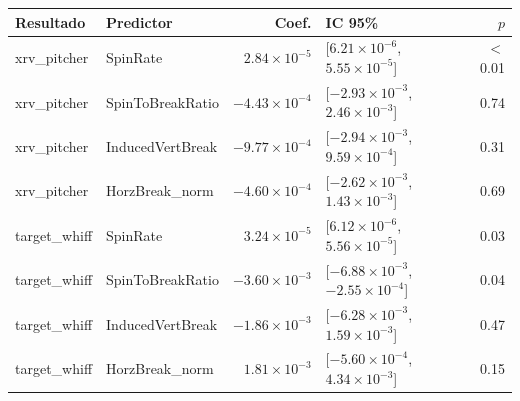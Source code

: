 \begin{tabular}{llrlr}
\toprule
Resultado & Predictor & Coef. & IC 95\% & $p$ \\
\midrule
xrv\_pitcher & SpinRate & $2.84\times10^{-5}$ & [$6.21\times10^{-6}$, $5.55\times10^{-5}$] & \ensuremath{<}0.01 \\
xrv\_pitcher & SpinToBreakRatio & $-4.43\times10^{-4}$ & [$-2.93\times10^{-3}$, $2.46\times10^{-3}$] & 0.74 \\
xrv\_pitcher & InducedVertBreak & $-9.77\times10^{-4}$ & [$-2.94\times10^{-3}$, $9.59\times10^{-4}$] & 0.31 \\
xrv\_pitcher & HorzBreak\_norm & $-4.60\times10^{-4}$ & [$-2.62\times10^{-3}$, $1.43\times10^{-3}$] & 0.69 \\
\midrule
target\_whiff & SpinRate & $3.24\times10^{-5}$ & [$6.12\times10^{-6}$, $5.56\times10^{-5}$] & 0.03 \\
target\_whiff & SpinToBreakRatio & $-3.60\times10^{-3}$ & [$-6.88\times10^{-3}$, $-2.55\times10^{-4}$] & 0.04 \\
target\_whiff & InducedVertBreak & $-1.86\times10^{-3}$ & [$-6.28\times10^{-3}$, $1.59\times10^{-3}$] & 0.47 \\
target\_whiff & HorzBreak\_norm & $1.81\times10^{-3}$ & [$-5.60\times10^{-4}$, $4.34\times10^{-3}$] & 0.15 \\
\bottomrule
\end{tabular}
